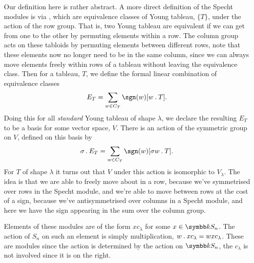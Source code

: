 \begin{remark}{}{}
    Our definition here is rather abstract.
    A more direct definition of the Specht modules is via , which are equivalence classes of Young tableau, \(\{T\}\), under the action of the row group.
    That is, two Young tableau are equivalent if we can get from one to the other by permuting elements within a row.
    The column group acts on these tabloids by permuting elements between different rows, note that these elements now no longer need to be in the same column, since we can always move elements freely within rows of a tableau without leaving the equivalence class.
    Then for a tableau, \(T\), we define the formal linear combination of equivalence classes
    \begin{equation}
        E_T = \sum_{w \in \columnGroup_T} \sgn(w)[w \action T].
    \end{equation}
    Doing this for all \emph{standard} Young tableau of shape \(\lambda\), we declare the resulting \(E_T\) to be a basis for some vector space, \(V\).
    There is an action of the symmetric group on \(V\), defined on this basis by
    \begin{equation}
        \sigma \action E_T = \sum_{w \in \columnGroup_T} \sgn(w)[\sigma w \action T].
    \end{equation}
    For \(T\) of shape \(\lambda\) it turns out that \(V\) under this action is isomorphic to \(V_\lambda\).
    The idea is that we are able to freely move about in a row, because we've symmetrised over rows in the Specht module, and we're able to move between rows at the cost of a sign, because we've antisymmetrised over columns in a Specht module, and here we have the sign appearing in the sum over the column group.
\end{remark}

Elements of these modules are of the form \(xc_\lambda\) for some \(x \in \field S_n\).
The action of \(S_n\) on such an element is simply multiplication, \(w \mathbin{.} x c_\lambda = wxc_\lambda\).
These are modules since the action is determined by the action on \(\field S_n\), the \(c_\lambda\) is not involved since it is on the right.

